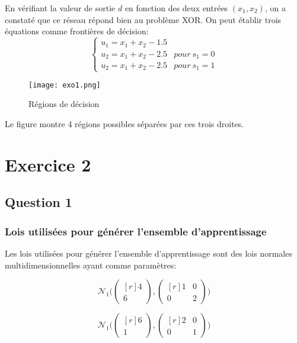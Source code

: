 \documentclass{article}
\begin{document}
\begin{multicols}{2}
En vérifiant la valeur de sortie $d$ en fonction des deux entrées
$(x_1,x_2)$, on a constaté que ce réseau répond bien au problème XOR.
On peut établir trois équations comme frontières de décision:
$$
\begin{cases}
    u_1 = x_1+x_2-1.5\\
    u_2 = x_1+x_2-2.5& pour \ s_1=0\\
    u_2 = x_1+x_2-2.5& pour\ s_1=1
\end{cases}$$

\begin{figure}[H]
    \begin{center}
        \texttt{[image: exo1.png]}
        \centering
        \captionsetup{justification=centering}
        \caption{\label{fig:ex1}Régions de décision}
    \end{center}
\end{figure}

Le figure montre 4 régions possibles séparées par ces trois droites.

\section{Exercice 2}\label{sec:ex2}

\subsection{Question 1}\label{subsec:ex21}

\subsubsection{Lois utilisées pour générer l'ensemble d'apprentissage}\label{subsubsec:ex211}

Les lois utilisées pour générer l'ensemble d'apprentissage sont des lois
normales multidimensionnelles ayant comme paramètres:

\begin{equation}
    \mathcal{N}_1\Bigg(\begin{pmatrix*}[r]
        4 \\
        6
    \end{pmatrix*}, \begin{pmatrix*}[r]
        1 & 0 \\
        0 & 2
    \end{pmatrix*}\Bigg)
\end{equation}

\begin{equation}
    \mathcal{N}_1\Bigg(\begin{pmatrix*}[r]
        6 \\
        1
    \end{pmatrix*}, \begin{pmatrix*}[r]
        2 & 0 \\
        0 & 1
    \end{pmatrix*}\Bigg)
\end{equation}


\end{multicols}
\end{document}
